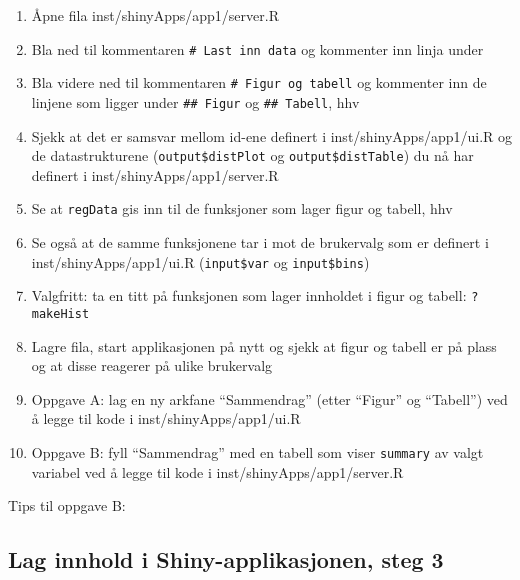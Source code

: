 \documentclass[]{article}
\newenvironment{Shaded}{\begin{snugshade}}{\end{snugshade}}
\newcommand{\KeywordTok}[1]{\textcolor[rgb]{0.13,0.29,0.53}{\textbf{#1}}}
\newcommand{\DataTypeTok}[1]{\textcolor[rgb]{0.13,0.29,0.53}{#1}}
\newcommand{\StringTok}[1]{\textcolor[rgb]{0.31,0.60,0.02}{#1}}
\newcommand{\OtherTok}[1]{\textcolor[rgb]{0.56,0.35,0.01}{#1}}
\newcommand{\OperatorTok}[1]{\textcolor[rgb]{0.81,0.36,0.00}{\textbf{#1}}}
\newcommand{\NormalTok}[1]{#1}
\providecommand{\tightlist}{%
  \setlength{\itemsep}{0pt}\setlength{\parskip}{0pt}}
\def\labelenumi{\arabic{enumi}.}
\begin{document}
\begin{enumerate}
\def\labelenumi{\arabic{enumi}.}
\tightlist
\item
  Åpne fila inst/shinyApps/app1/server.R
\item
  Bla ned til kommentaren \texttt{\#\ Last\ inn\ data} og kommenter inn
  linja under
\item
  Bla videre ned til kommentaren \texttt{\#\ Figur\ og\ tabell} og
  kommenter inn de linjene som ligger under \texttt{\#\#\ Figur} og
  \texttt{\#\#\ Tabell}, hhv
\item
  Sjekk at det er samsvar mellom id-ene definert i
  inst/shinyApps/app1/ui.R og de datastrukturene
  (\texttt{output\$distPlot} og \texttt{output\$distTable}) du nå har
  definert i inst/shinyApps/app1/server.R
\item
  Se at \texttt{regData} gis inn til de funksjoner som lager figur og
  tabell, hhv
\item
  Se også at de samme funksjonene tar i mot de brukervalg som er
  definert i inst/shinyApps/app1/ui.R (\texttt{input\$var} og
  \texttt{input\$bins})
\item
  Valgfritt: ta en titt på funksjonen som lager innholdet i figur og
  tabell: \texttt{?makeHist}
\item
  Lagre fila, start applikasjonen på nytt og sjekk at figur og tabell er
  på plass og at disse reagerer på ulike brukervalg
\item
  Oppgave A: lag en ny arkfane ``Sammendrag'' (etter ``Figur'' og
  ``Tabell'') ved å legge til kode i inst/shinyApps/app1/ui.R
\item
  Oppgave B: fyll ``Sammendrag'' med en tabell som viser
  \texttt{summary} av valgt variabel ved å legge til kode i
  inst/shinyApps/app1/server.R
\end{enumerate}

Tips til oppgave B:

\begin{Shaded}
\end{Shaded}

\subsection{Lag innhold i Shiny-applikasjonen, steg
3}\label{lag-innhold-i-shiny-applikasjonen-steg-3}
\end{document}
